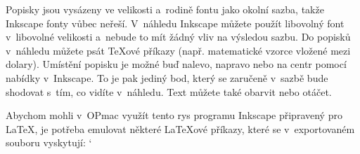 Popisky jsou vysázeny ve velikosti a~rodině fontu jako okolní sazba, takže Inkscape fonty vůbec neřeší. V~náhledu Inkscape můžete použít libovolný font v~libovolné velikosti a~nebude to mít žádný vliv na výsledou sazbu. Do popisků v~náhledu můžete psát TeXové příkazy (např. matematické vzorce vložené mezi dolary). Umístění popisku je možné buď nalevo, napravo nebo na centr pomocí nabídky v~Inkscape. To je pak jediný bod, který se zaručeně v~sazbě bude shodovat s~tím, co vidíte v~náhledu. Text můžete také obarvit nebo otáčet. 



Abychom mohli v~OPmac využít tento rys programu Inkscape připravený pro LaTeX, je potřeba emulovat některé LaTeXové příkazy, které se v~exportovaném souboru vyskytují: `
